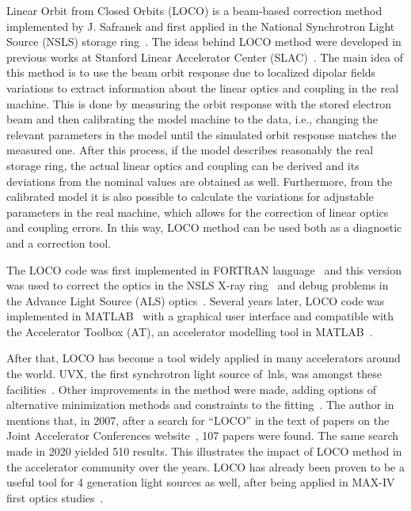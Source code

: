 Linear Orbit from Closed Orbits (LOCO) is a beam-based correction method implemented by J. Safranek and first applied in the National Synchrotron Light Source (NSLS) storage ring~\cite{safranek1994, safranek1995, safranek1997}. The ideas behind LOCO method were developed in previous works at Stanford Linear Accelerator Center (SLAC)~\cite{martin1992, corbett1993}. The main idea of this method is to use the beam orbit response due to localized dipolar fields variations to extract information about the linear optics and coupling in the real machine. This is done by measuring the orbit response with the stored electron beam and then calibrating the model machine to the data, i.e., changing the relevant parameters in the model until the simulated orbit response matches the measured one. After this process, if the model describes reasonably the real storage ring, the actual linear optics and coupling can be derived and its deviations from the nominal values are obtained as well. Furthermore, from the calibrated model it is also possible to calculate the variations for adjustable parameters in the real machine, which allows for the correction of linear optics and coupling errors. In this way, LOCO method can be used both as a diagnostic and a correction tool.

The LOCO code was first implemented in FORTRAN language~\cite{icfa_safranek} and this version was used to correct the optics in the NSLS X-ray ring~\cite{safranek1997} and debug problems in the Advance Light Source (ALS) optics~\cite{robin1996}. Several years later, LOCO code was implemented in MATLAB~\cite{safranek2002, icfa_greg} with a graphical user interface and compatible with the Accelerator Toolbox (AT), an accelerator modelling tool in MATLAB~\cite{terebilo2001}. 

After that, LOCO has become a tool widely applied in many accelerators around the world. UVX, the first synchrotron light source of~\gls{lnls}, was amongst these facilities~\cite{resende2010}. Other improvements in the method were made, adding options of alternative minimization methods and constraints to the fitting~\cite{icfa_huang}. The author in~\cite{icfa_safranek} mentions that, in 2007, after a search for ``LOCO'' in the text of papers on the Joint Accelerator Conferences website~\cite{jacow}, 107 papers were found. The same search made in 2020 yielded 510 results. This illustrates the impact of LOCO method in the accelerator community over the years. LOCO has already been proven to be a useful tool for 4 generation light sources as well, after being applied in MAX-IV first optics studies~\cite{leemann2017}.

